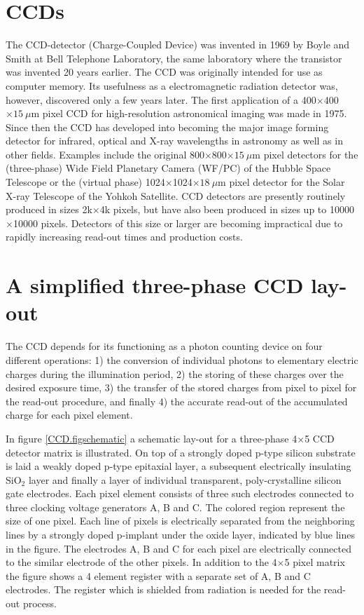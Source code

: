 \section{CCDs}

The CCD-detector (Charge-Coupled Device) was invented in 1969 by Boyle
and Smith at Bell Telephone Laboratory, the same laboratory where the
transistor was invented 20 years earlier. The CCD was originally
intended for use as computer memory. Its usefulness as a
electromagnetic radiation detector was, however, discovered only a few
years later. The first application of a 400$\times$400$\times 15~\mu$m
pixel CCD for high-resolution astronomical imaging was made in
1975. Since then the CCD has developed into becoming the major image
forming detector for infrared, optical and X-ray wavelengths in
astronomy as well as in other fields.  Examples include the original
800$\times$800$\times 15~\mu$m pixel detectors for the (three-phase)
Wide Field Planetary Camera (WF/PC) of the Hubble Space Telescope or
the (virtual phase) 1024$\times$1024$\times 18~\mu$m pixel detector
for the Solar X-ray Telescope of the Yohkoh Satellite. CCD detectors
are presently routinely produced in sizes 2k$\times$4k pixels, but
have also been produced in sizes up to 10000$\times$10000
pixels. Detectors of this size or larger are becoming impractical due
to rapidly increasing read-out times and production costs.

\section{A simplified three-phase CCD lay-out}

The CCD depends for its functioning as a photon counting device on
four different operations: 1) the conversion of individual photons to
elementary electric charges during the illumination period, 2) the
storing of these charges over the desired exposure time, 3) the
transfer of the stored charges from pixel to pixel for the read-out
procedure, and finally 4) the accurate read-out of the accumulated
charge for each pixel element.  

In figure \ref{CCD.figschematic} a schematic lay-out for a three-phase
4$\times $5 CCD detector matrix is illustrated.  On top of a strongly
doped p-type silicon substrate is laid a weakly doped p-type epitaxial
layer, a subsequent electrically insulating SiO$_2$ layer and finally
a layer of individual transparent, poly-crystalline silicon gate
electrodes.  Each pixel element consists of three such electrodes
connected to three clocking voltage generators A, B and C. The colored
region represent the size of one pixel. Each line of pixels is
electrically separated from the neighboring lines by a strongly doped
p-implant under the oxide layer, indicated by blue lines in the
figure. The electrodes A, B and C for each pixel are electrically
connected to the similar electrode of the other pixels. In addition to
the 4$\times$5 pixel matrix the figure shows a 4 element register with
a separate set of A, B and C electrodes. The register which is
shielded from radiation is needed for the read-out process.

